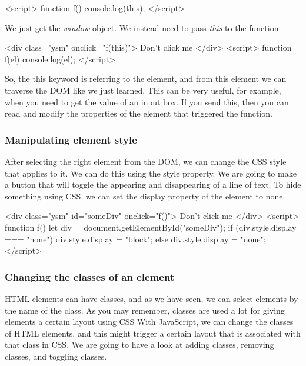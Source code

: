 \documentclass{report}
\begin{document}
\begin{jscode}
\begin{jscode}
    <script>
        function f() {
            console.log(this);
        }
    </script>
\end{jscode}
\bigbreak \noindent 
We just get the \textit{window} object.
\bigbreak \noindent 
We instead need to pass \textit{this} to the function
\bigbreak \noindent 
\begin{jscode}
    <div class="ysm" onclick="f(this)"> Don't click me </div>
    <script> 
        function f(el) {
            console.log(el);
        }
    </script>
\end{jscode}
\bigbreak \noindent 
So, the this keyword is referring to the element, and from this element we can
traverse the DOM like we just learned. This can be very useful, for example, when
you need to get the value of an input box. If you send this, then you can read and
modify the properties of the element that triggered the function.

\bigbreak \noindent 
\subsubsection{Manipulating element style}
\bigbreak \noindent 
After selecting the right element from the DOM, we can change the CSS style that
applies to it. We can do this using the style property.
\bigbreak \noindent 
We are going to make a button that will toggle the appearing and disappearing of
a line of text. To hide something using CSS, we can set the display property of the
element to none.
\bigbreak \noindent 
\begin{htmlcode}
    <div class="ysm" id="someDiv" onclick="f()"> Don't click me </div>
    <script> 
        function f() {
            let div = document.getElementById("someDiv");
            if (div.style.display === "none") {
                div.style.display = "block";
            } else {
                div.style.display = "none";
            }
    }
    </script>
\end{htmlcode}

\bigbreak \noindent 
\subsubsection{Changing the classes of an element}
\bigbreak \noindent 
HTML elements can have classes, and as we have seen, we can select elements by the
name of the class. As you may remember, classes are used a lot for giving elements a
certain layout using CSS
\bigbreak \noindent 
With JavaScript, we can change the classes of HTML elements, and this might trigger
a certain layout that is associated with that class in CSS. We are going to have a look
at adding classes, removing classes, and toggling classes.


\end{jscode}
\end{document}
